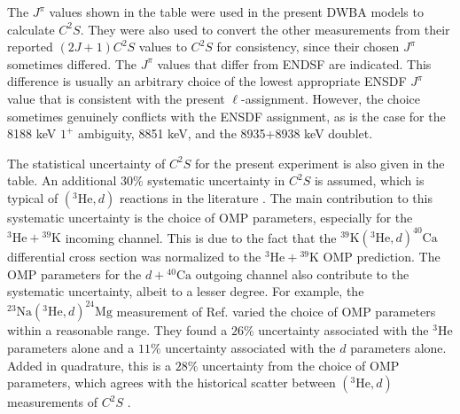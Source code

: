 The $J^{\pi}$ values shown in the table were used in the present DWBA models to calculate $C^{2}S$. They were also used to convert the other measurements from their reported $(2J+1)C^{2}S$ values to $C^{2}S$ for consistency, since their chosen $J^{\pi}$ sometimes differed. The $J^{\pi}$ values that differ from ENDSF are indicated. This difference is usually an arbitrary choice of the lowest appropriate ENSDF $J^{\pi}$ value that is consistent with the present $\ell$-assignment. However, the choice sometimes genuinely conflicts with the ENSDF assignment, as is the case for the 8188 keV $1^{+}$ ambiguity, 8851 keV, and the 8935+8938 keV doublet.

The statistical uncertainty of $C^{2}S$ for the present experiment is also given in the table. An additional $30\%$ systematic uncertainty in $C^{2}S$ is assumed, which is typical of $(^{3}\mathrm{He},d)$ reactions in the literature \cite{Endt1977}. The main contribution to this systematic uncertainty is the choice of OMP parameters, especially for the $^{3}\mathrm{He} + {}^{39}\mathrm{K}$ incoming channel. This is due to the fact that the $^{39}\mathrm{K}(^{3}\mathrm{He},d)^{40}\mathrm{Ca}$ differential cross section was normalized to the $^{3}\mathrm{He} + {}^{39}\mathrm{K}$ OMP prediction. The OMP parameters for the $d + {}^{40}\mathrm{Ca}$ outgoing channel also contribute to the systematic uncertainty, albeit to a lesser degree. For example, the $^{23}\mathrm{Na}(^{3}\mathrm{He},d)^{24}\mathrm{Mg}$ measurement of Ref. \cite{Hale2004} varied the choice of OMP parameters within a reasonable range. They found a $26\%$ uncertainty associated with the $^{3}$He parameters alone and a $11\%$ uncertainty associated with the $d$ parameters alone. Added in quadrature, this is a $28\%$ uncertainty from the choice of OMP parameters, which agrees with the historical scatter between $(^{3}\mathrm{He},d)$ measurements of $C^{2}S$ \cite{Endt1977}.





